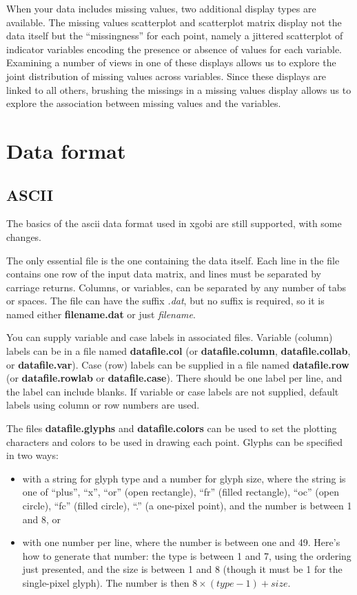 \documentclass[11pt]{article}
\begin{document}
When your data includes missing values, two additional display types
are available.  The missing values scatterplot and scatterplot matrix
display not the data itself but the ``missingness'' for each point, namely
a jittered scatterplot of indicator variables encoding the presence or
absence of values for each variable.  Examining a number of views in one
of these displays allows us to explore the joint distribution of missing
values across variables.  Since these displays are linked to all others,
brushing the missings in a missing values display allows us to explore
the association between missing values and the variables.

\section{Data format}
\label{slbl:DataFormat}

\subsection {ASCII}
\label{slbl:ASCII}

The basics of the ascii data format used in xgobi are still supported, with
some changes.

The only essential file is the one containing the data itself.  Each
line in the file contains one row of the input data matrix, and lines
must be separated by carriage returns.  Columns, or variables, can be
separated by any number of tabs or spaces.  The file can have the
suffix {\em .dat}, but no suffix is required, so it is named either
{\bf filename.dat} or just {\em filename}.

You can supply variable and case labels in associated files.
Variable (column) labels can be in a file named {\bf datafile.col}
(or {\bf datafile.column}, {\bf datafile.collab}, or {\bf
datafile.var}).  Case (row) labels can be supplied in a file named
{\bf datafile.row} (or {\bf data\-file.row\-lab} or {\bf
data\-file.case}).  There should be one label per line, and the label
can include blanks.  If variable or case labels are not supplied,
default labels using column or row numbers are used.

The files {\bf datafile.glyphs} and {\bf datafile.colors} can be
used to set the plotting characters and colors to be used in
drawing each point.  Glyphs can be specified in two ways:

\begin{itemize}
\item with a string for glyph type and a number for glyph size, where
the string is one of ``plus'', ``x'', ``or'' (open rectangle), ``fr''
(filled rectangle), ``oc'' (open circle), ``fc'' (filled circle),
``.'' (a one-pixel point), and the number is between 1 and 8, or
\item with one number per line, where the number is between one and
49.  Here's how to generate that number: the type is between 1 and 7,
using the ordering just presented, and the size is between 1 and 8
(though it must be 1 for the single-pixel glyph).  The number is then
$8 \times (type-1) + size$.
\end{itemize}
\end{document}

